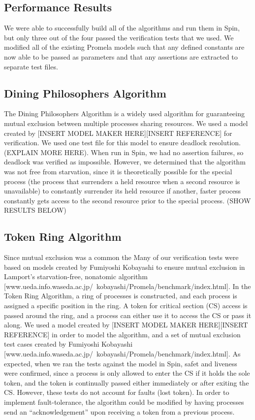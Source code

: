 \documentclass[12pt]{article}
\begin{document}
\begin{flushleft}
\section{Performance Results}
We were able to successfully build all of the algorithms and run them in Spin, but only three out of the four passed the verification tests that we used. We modified all of the existing Promela models such that any defined constants are now able to be passed as parameters and that any assertions are extracted to separate test files.

\subsection{Dining Philosophers Algorithm}
The Dining Philosophers Algorithm is a widely used algorithm for guaranteeing mutual exclusion between multiple processes sharing resources. We used a model created by [INSERT MODEL MAKER HERE][INSERT REFERENCE] for verification. We used one test file for this model to ensure deadlock resolution. (EXPLAIN MORE HERE). When run in Spin, we had no assertion failures, so deadlock was verified as impossible. However, we determined that the algorithm was not free from starvation, since it is theoretically possible for the special process (the process that surrenders a held resource when a second resource is unavailable) to constantly surrender its held resource if another, faster process constantly gets access to the second resource prior to the special process. (SHOW RESULTS BELOW)

\subsection{Token Ring Algorithm}
Since mutual exclusion was a common the Many of our verification tests were based on models created by Fumiyoshi Kobayashi to ensure mutual exclusion in Lamport's starvation-free, nonatomic algorithm [www.ueda.info.waseda.ac.jp/~kobayashi/Promela/benchmark/index.html].
In the Token Ring Algorithm, a ring of processes is constructed, and each process is assigned a specific position in the ring. A token for critical section (CS) access is passed around the ring, and a process can either use it to access the CS or pass it along. We used a model created by [INSERT MODEL MAKER HERE][INSERT REFERENCE] in order to model the algorithm, and a set of mutual exclusion test cases created by Fumiyoshi Kobayashi [www.ueda.info.waseda.ac.jp/~kobayashi/Promela/benchmark/index.html]. As expected, when we ran the tests against the model in Spin, safet and liveness were confirmed, since a process is only allowed to enter the CS if it holds the sole token, and the token is continually passed either immediately or after exiting the CS. However, these tests do not account for faults (lost token). In order to implement fault-tolerance, the algorithm could be modified by having processes send an “acknowledgement” upon receiving a token from a previous process.


\end{flushleft}
\end{document}
